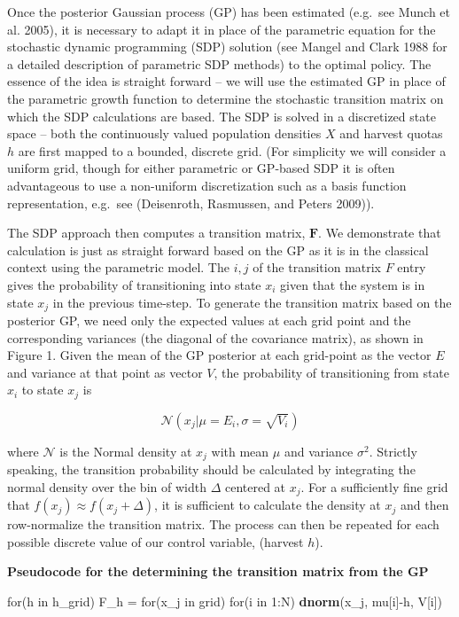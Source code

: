 \documentclass[author-year, review]{elsarticle} %
\newenvironment{Shaded}{}{}
\newcommand{\KeywordTok}[1]{\textcolor[rgb]{0.00,0.44,0.13}{\textbf{{#1}}}}
\newcommand{\DecValTok}[1]{\textcolor[rgb]{0.25,0.63,0.44}{{#1}}}
\newcommand{\NormalTok}[1]{{#1}}
\begin{document}
Once the posterior Gaussian process (GP) has been estimated (e.g.~see
Munch et al. 2005), it is necessary to adapt it in place of the
parametric equation for the stochastic dynamic programming (SDP)
solution (see Mangel and Clark 1988 for a detailed description of
parametric SDP methods) to the optimal policy. The essence of the idea
is straight forward -- we will use the estimated GP in place of the
parametric growth function to determine the stochastic transition matrix
on which the SDP calculations are based. The SDP is solved in a
discretized state space -- both the continuously valued population
densities $X$ and harvest quotas $h$ are first mapped to a bounded,
discrete grid. (For simplicity we will consider a uniform grid, though
for either parametric or GP-based SDP it is often advantageous to use a
non-uniform discretization such as a basis function representation,
e.g.~see (Deisenroth, Rasmussen, and Peters 2009)).

The SDP approach then computes a transition matrix, $\mathbf{F}$. We
demonstrate that calculation is just as straight forward based on the GP
as it is in the classical context using the parametric model. The
${i,j}$ of the transition matrix $F$ entry gives the probability of
transitioning into state $x_i$ given that the system is in state $x_j$
in the previous time-step. To generate the transition matrix based on
the posterior GP, we need only the expected values at each grid point
and the corresponding variances (the diagonal of the covariance matrix),
as shown in Figure 1. Given the mean of the GP posterior at each
grid-point as the vector $E$ and variance at that point as vector $V$,
the probability of transitioning from state $x_i$ to state $x_j$ is

\[\mathcal{N}\left(x_j \vert  \mu = E_i, \sigma = \sqrt{V_i}\right)\]

where $\mathcal{N}$ is the Normal density at $x_j$ with mean $\mu$ and
variance $\sigma^2$. Strictly speaking, the transition probability
should be calculated by integrating the normal density over the bin of
width $\Delta$ centered at $x_j$. For a sufficiently fine grid that
$f(x_j) \approx f(x_j + \Delta)$, it is sufficient to calculate the
density at $x_j$ and then row-normalize the transition matrix. The
process can then be repeated for each possible discrete value of our
control variable, (harvest $h$).

\textbf{Pseudocode for the determining the transition matrix from the
GP}

\begin{Shaded}
\begin{Highlighting}[]
\NormalTok{for(h in h_grid)}
  \NormalTok{F_h = for(x_j in grid)}
          \NormalTok{for(i in }\DecValTok{1}\NormalTok{:N) }
            \KeywordTok{dnorm}\NormalTok{(x_j, mu[i]-h, V[i])}
\end{Highlighting}
\end{Shaded}
\end{document}
